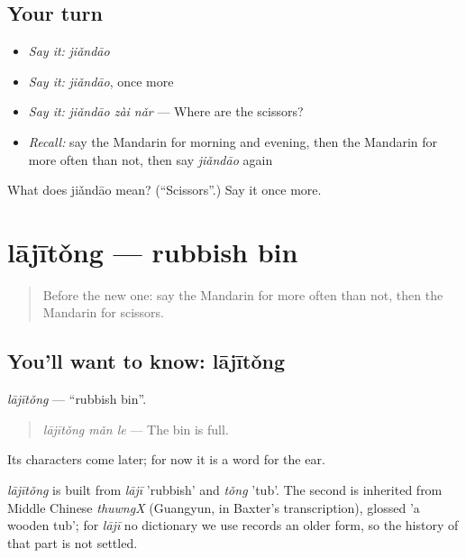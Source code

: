 \subsection*{Your turn}
\begin{itemize}
\raggedright
  \item \emph{Say it:} \emph{jiǎndāo}
  \item \emph{Say it:} \emph{jiǎndāo}, once more
  \item \emph{Say it:} \emph{jiǎndāo zài nǎr} — Where are the scissors?
  \item \emph{Recall:} say the Mandarin for morning and evening, then the Mandarin for more often than not, then say \emph{jiǎndāo} again
\end{itemize}

\begin{tcolorbox}[breakable,colback=teal!4,colframe=teal!35!black,title={Before you move on}]
What does jiǎndāo mean? (\textquotedblleft{}Scissors\textquotedblright{}.) Say it once more.
\end{tcolorbox}
\section[lājītǒng]{lājītǒng — rubbish bin}

\label{lesson:ZH-C186-lajitong}



\begin{quote}
Before the new one: say the Mandarin for more often than not, then the Mandarin for scissors.
\end{quote}

\subsection*{You'll want to know: lājītǒng}
\emph{lājītǒng} — \textquotedblleft{}rubbish bin\textquotedblright{}.

\begin{quote}
\emph{lājītǒng mǎn le} — The bin is full.
\end{quote}

Its characters come later; for now it is a word for the ear.

\begin{cousinweb}
\emph{lājītǒng} is built from \emph{lājī} 'rubbish' and \emph{tǒng} 'tub'. The second is inherited from Middle Chinese \emph{thuwngX} (Guangyun, in Baxter's transcription), glossed 'a wooden tub'; for \emph{lājī} no dictionary we use records an older form, so the history of that part is not settled.
\end{cousinweb}

